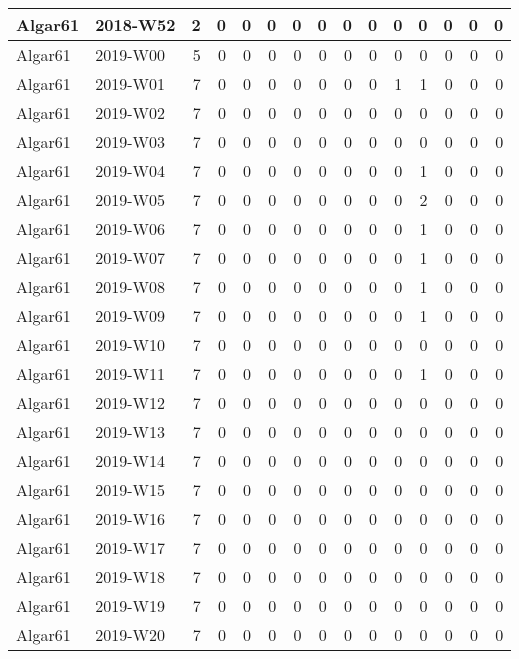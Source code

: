 \documentclass[]{book}
\begin{document}
\begin{table}
\begin{tabular}[t]{l|l|r|r|r|r|r|r|r|r|r|r|r|r|r}
\hline
Algar61 & 2018-W52 & 2 & 0 & 0 & 0 & 0 & 0 & 0 & 0 & 0 & 0 & 0 & 0 & 0\\
\hline
Algar61 & 2019-W00 & 5 & 0 & 0 & 0 & 0 & 0 & 0 & 0 & 0 & 0 & 0 & 0 & 0\\
\hline
Algar61 & 2019-W01 & 7 & 0 & 0 & 0 & 0 & 0 & 0 & 0 & 1 & 1 & 0 & 0 & 0\\
\hline
Algar61 & 2019-W02 & 7 & 0 & 0 & 0 & 0 & 0 & 0 & 0 & 0 & 0 & 0 & 0 & 0\\
\hline
Algar61 & 2019-W03 & 7 & 0 & 0 & 0 & 0 & 0 & 0 & 0 & 0 & 0 & 0 & 0 & 0\\
\hline
Algar61 & 2019-W04 & 7 & 0 & 0 & 0 & 0 & 0 & 0 & 0 & 0 & 1 & 0 & 0 & 0\\
\hline
Algar61 & 2019-W05 & 7 & 0 & 0 & 0 & 0 & 0 & 0 & 0 & 0 & 2 & 0 & 0 & 0\\
\hline
Algar61 & 2019-W06 & 7 & 0 & 0 & 0 & 0 & 0 & 0 & 0 & 0 & 1 & 0 & 0 & 0\\
\hline
Algar61 & 2019-W07 & 7 & 0 & 0 & 0 & 0 & 0 & 0 & 0 & 0 & 1 & 0 & 0 & 0\\
\hline
Algar61 & 2019-W08 & 7 & 0 & 0 & 0 & 0 & 0 & 0 & 0 & 0 & 1 & 0 & 0 & 0\\
\hline
Algar61 & 2019-W09 & 7 & 0 & 0 & 0 & 0 & 0 & 0 & 0 & 0 & 1 & 0 & 0 & 0\\
\hline
Algar61 & 2019-W10 & 7 & 0 & 0 & 0 & 0 & 0 & 0 & 0 & 0 & 0 & 0 & 0 & 0\\
\hline
Algar61 & 2019-W11 & 7 & 0 & 0 & 0 & 0 & 0 & 0 & 0 & 0 & 1 & 0 & 0 & 0\\
\hline
Algar61 & 2019-W12 & 7 & 0 & 0 & 0 & 0 & 0 & 0 & 0 & 0 & 0 & 0 & 0 & 0\\
\hline
Algar61 & 2019-W13 & 7 & 0 & 0 & 0 & 0 & 0 & 0 & 0 & 0 & 0 & 0 & 0 & 0\\
\hline
Algar61 & 2019-W14 & 7 & 0 & 0 & 0 & 0 & 0 & 0 & 0 & 0 & 0 & 0 & 0 & 0\\
\hline
Algar61 & 2019-W15 & 7 & 0 & 0 & 0 & 0 & 0 & 0 & 0 & 0 & 0 & 0 & 0 & 0\\
\hline
Algar61 & 2019-W16 & 7 & 0 & 0 & 0 & 0 & 0 & 0 & 0 & 0 & 0 & 0 & 0 & 0\\
\hline
Algar61 & 2019-W17 & 7 & 0 & 0 & 0 & 0 & 0 & 0 & 0 & 0 & 0 & 0 & 0 & 0\\
\hline
Algar61 & 2019-W18 & 7 & 0 & 0 & 0 & 0 & 0 & 0 & 0 & 0 & 0 & 0 & 0 & 0\\
\hline
Algar61 & 2019-W19 & 7 & 0 & 0 & 0 & 0 & 0 & 0 & 0 & 0 & 0 & 0 & 0 & 0\\
\hline
Algar61 & 2019-W20 & 7 & 0 & 0 & 0 & 0 & 0 & 0 & 0 & 0 & 0 & 0 & 0 & 0\\

\end{tabular}
\end{table}
\end{document}
